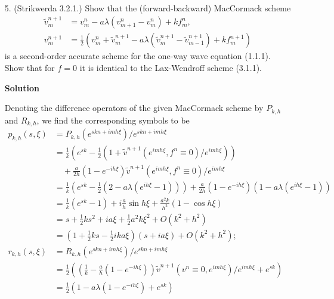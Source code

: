 \documentclass{article}
\begin{document}
\begin{itemize}
\item[5.] (Strikwerda 3.2.1.) Show that the (forward-backward) MacCormack scheme
\begin{align*}
\tilde{v}^{n+1}_m & = v^n_m - a \lambda \left( v^n_{m+1} - v^n_m \right) + k f^n_m, \\
v^{n+1}_m & = \frac{1}{2} \left( v^n_m + \tilde{v}^{n+1}_m - a \lambda \left( \tilde{v}^{n+1}_m - \tilde{v}^{n+1}_{m-1} \right) + k f^{n+1}_m \right)
\end{align*}
is a second-order accurate scheme for the one-way wave equation (1.1.1). Show that for $f = 0$ it is identical to the Lax-Wendroff scheme (3.1.1).

\textbf{Solution}

Denoting the difference operators of the given MacCormack scheme by $P_{k,h}$ and $R_{k,h}$, we find the corresponding symbols to be
\begin{align*}
p_{k,h}(s,\xi) & = P_{k,h} \left( e^{skn + imh\xi} \right) / e^{skn + imh\xi} \\
               & = \frac{1}{k} \left( e^{sk} - \frac{1}{2} \left( 1 + \tilde{v}^{n+1} \left( e^{imh\xi}, f^n \equiv 0 \right) / e^{imh\xi} \right) \right) \\
               & \quad {} + \frac{a}{2h} \left( 1 - e^{-ih\xi} \right) \tilde{v}^{n+1} \left( e^{imh\xi}, f^n \equiv 0 \right) / e^{imh\xi} \\
               & = \frac{1}{k} \left( e^{sk} - \frac{1}{2} \left( 2 - a \lambda \left( e^{ih\xi} - 1 \right) \right) \right) + \frac{a}{2h} \left( 1 - e^{-ih\xi} \right) \left( 1 - a \lambda \left( e^{ih\xi} - 1 \right) \right) \\
               & = \frac{1}{k} \left( e^{sk} - 1 \right) + i \frac{a}{h} \sin h \xi + \frac{a^2k}{h^2} \left( 1 - \cos h \xi \right) \\
               & = s + \frac{1}{2} k s^2 + i a \xi + \frac{1}{2} a^2 k \xi^2 + O \left( k^2 + h^2 \right) \\
               & = \left( 1 + \frac{1}{2} k s - \frac{1}{2} i k a \xi \right) \left( s + i a \xi \right) + O \left( k^2 + h^2 \right); \\
r_{k,h}(s,\xi) & = R_{k,h} \left( e^{skn + imh\xi} \right) / e^{skn + imh\xi} \\
               & = \frac{1}{2} \left( \left( \frac{1}{k} - \frac{a}{h} \left( 1 - e^{-ih\xi} \right) \right) \tilde{v}^{n+1} \left( v^n \equiv 0, e^{imh\xi} \right) / e^{imh\xi} + e^{sk} \right) \\
               & = \frac{1}{2} \left( 1 - a \lambda \left( 1 - e^{-ih\xi} \right) + e^{sk} \right) \\

\end{align*}
\end{itemize}
\end{document}
